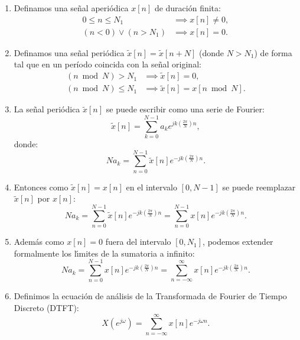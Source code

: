 \begin{enumerate}
	\item Definamos una se\~{n}al aperi\'{o}dica $x[n]$ de duración finita:
	\begin{align}
		0 \leq n \leq N_{1} &\implies x[n] \neq 0, \\
		(n < 0) \vee (n > N_{1}) &\implies x[n] = 0.
	\end{align}
	
	\item Definamos una se\~{n}al peri\'{o}dica $\tilde{x}[n] = \tilde{x}[n+N]$ (donde $N > N_{1}$) de forma tal que en un período coincida con la señal original:
	\begin{align}
		(n \bmod N) > N_{1} &\implies \tilde{x}[n] = 0, \\ 
		(n \bmod N) \leq N_{1} &\implies \tilde{x}[n] = x[n \bmod N].
	\end{align}
	
	\item La se\~{n}al peri\'{o}dica $\tilde{x}[n]$ se puede escribir como una serie de Fourier:
	\begin{equation}
		\tilde{x}[n] = \sum_{k=0}^{N-1} a_{k} e^{jk\left(\frac{2\pi}{N}\right)n},
	\end{equation}
	donde:
	\begin{equation}
		N a_{k} = \sum_{n=0}^{N-1} \tilde{x}[n] e^{-jk\left(\frac{2\pi}{N}\right)n}.
	\end{equation}
	
	\item Entonces como $\tilde{x}[n] = x[n]$ en el intervalo $[0,N-1]$ se puede reemplazar $\tilde{x}[n]$ por $x[n]$:
	\begin{equation}
		N a_{k} = \sum_{n=0}^{N-1} \tilde{x}[n] e^{-jk\left(\frac{2\pi}{N}\right)n} = \sum_{n=0}^{N-1} x[n] e^{-jk\left(\frac{2\pi}{N}\right)n}.
	\end{equation}
	
	\item Adem\'{a}s como $x[n] = 0$ fuera del intervalo $[0,N_{1}]$, podemos extender formalmente los l\'{\i}mites de la sumatoria a infinito:
	\begin{equation}
		N a_{k} = \sum_{n=0}^{N-1} x[n] e^{-jk\left(\frac{2\pi}{N}\right)n} = \sum_{n=-\infty}^{\infty} x[n] e^{-jk\left(\frac{2\pi}{N}\right)n}.
	\end{equation}
	
	\item Definimos la ecuaci\'{o}n de an\'{a}lisis de la Transformada de Fourier de Tiempo Discreto (DTFT):
	\begin{equation}
		X(e^{j\omega}) = \sum_{n=-\infty}^{\infty} x[n] e^{-j\omega n}.
	\end{equation}
\end{enumerate}

